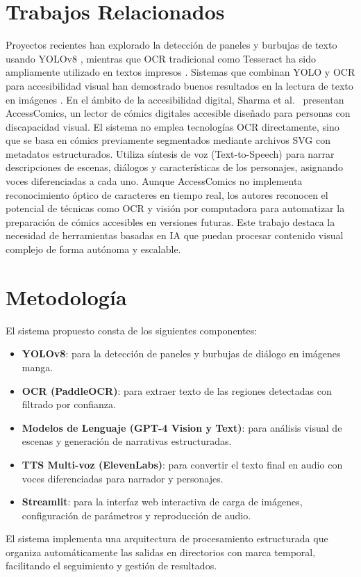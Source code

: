 \documentclass[conference]{IEEEtran}
\begin{document}
\section{Trabajos Relacionados}
Proyectos recientes han explorado la detección de paneles y burbujas de texto usando YOLOv8 \cite{yolov8comics}, mientras que OCR tradicional como Tesseract ha sido ampliamente utilizado en textos impresos \cite{smith2007tesseract}. Sistemas que combinan YOLO y OCR para accesibilidad visual han demostrado buenos resultados en la lectura de texto en imágenes \cite{patel2022ocrtts}.
En el ámbito de la accesibilidad digital, Sharma et al.\ \cite{sharma2021accesscomics} presentan AccessComics, un lector de cómics digitales accesible diseñado para personas con discapacidad visual. El sistema no emplea tecnologías OCR directamente, sino que se basa en cómics previamente segmentados mediante archivos SVG con metadatos estructurados. Utiliza síntesis de voz (Text-to-Speech) para narrar descripciones de escenas, diálogos y características de los personajes, asignando voces diferenciadas a cada uno. Aunque AccessComics no implementa reconocimiento óptico de caracteres en tiempo real, los autores reconocen el potencial de técnicas como OCR y visión por computadora para automatizar la preparación de cómics accesibles en versiones futuras. Este trabajo destaca la necesidad de herramientas basadas en IA que puedan procesar contenido visual complejo de forma autónoma y escalable.

\section{Metodología}
El sistema propuesto consta de los siguientes componentes:
\begin{itemize}
\item \textbf{YOLOv8}: para la detección de paneles y burbujas de diálogo en imágenes manga.
\item \textbf{OCR (PaddleOCR)}: para extraer texto de las regiones detectadas con filtrado por confianza.
\item \textbf{Modelos de Lenguaje (GPT-4 Vision y Text)}: para análisis visual de escenas y generación de narrativas estructuradas.
\item \textbf{TTS Multi-voz (ElevenLabs)}: para convertir el texto final en audio con voces diferenciadas para narrador y personajes.
\item \textbf{Streamlit}: para la interfaz web interactiva de carga de imágenes, configuración de parámetros y reproducción de audio.
\end{itemize}
El sistema implementa una arquitectura de procesamiento estructurada que organiza automáticamente las salidas en directorios con marca temporal, facilitando el seguimiento y gestión de resultados.
\end{document}
